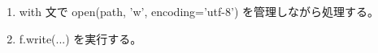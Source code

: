 \documentclass[a4paper,11pt]{article}
\begin{document}
\begin{enumerate}[leftmargin=1.8em]
<thead><tr><th>key</th><th>value</th></tr></thead>\textbackslash{}n        <tbody>\{overrides\_html\}</tbody>\textbackslash{}n      </table>\textbackslash{}n    </div>\textbackslash{}n\textbackslash{}n    <div class="section">\textbackslash{}n      <h2>Resolved Parameters</h2>\textbackslash{}n      <table>\textbackslash{}n        <thead><tr><th>parameter</th><th>value</th></tr></thead>\textbackslash{}n        <tbody>\{params\_html\}</tbody>\textbackslash{}n      </table>\textbackslash{}n    </div>\textbackslash{}n  </div>\textbackslash{}n</body>\textbackslash{}n</html>\textbackslash{}n""" の結果を代入する。
\item with 文で open(path, 'w', encoding='utf-8') を管理しながら処理する。
\item   f.write(...) を実行する。
            \end{enumerate}
\end{document}
